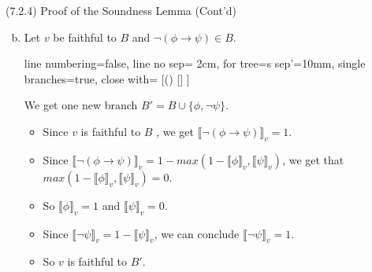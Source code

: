 \documentclass[../slides.tex]{subfiles}
\begin{document}
\begin{frame}{(7.2.4)  Proof of the Soundness Lemma (Cont'd)}
	
	\begin{enumerate}[(a)]

	\setcounter{enumi}{1}
					
		\item Let $v$ be faithful to $B$ and $\neg(\phi\to\psi)\in B$.
				\begin{center}{\small
					\begin{prooftree}
					{
					line numbering=false,
					line no sep= 2cm,
					for tree={s sep'=10mm},
					single branches=true,
					close with=\xmark
					}
					[\neg(\phi\to\psi) [\phi [\neg\psi ] ] ]
					\end{prooftree}}
					\end{center}
			We get one new branch $B'=B\cup\{\phi,\neg\psi\}$.
			
			\begin{itemize}
			
				\item Since $v$ is faithful to $B$ , we get $\llbracket\neg(\phi\to\psi)\rrbracket_v=1$.
				
				\item Since $\llbracket\neg(\phi\to\psi)\rrbracket_v=1-max(1-\llbracket\phi\rrbracket_v, \llbracket\psi\rrbracket_v)$, we get that $max(1-\llbracket\phi\rrbracket_v, \llbracket\psi\rrbracket_v)=0$.
				
				\item So $\llbracket\phi\rrbracket_v=1$ and $\llbracket\psi\rrbracket_v=0$.
			
				\item Since $\llbracket\neg\psi\rrbracket_v=1-\llbracket\psi\rrbracket_v$, we can conclude  $\llbracket\neg\psi\rrbracket_v=1$.
				
				\item So $v$ is faithful to $B'$.
			
			\end{itemize}
					
	\end{enumerate}

\end{frame}
\end{document}
